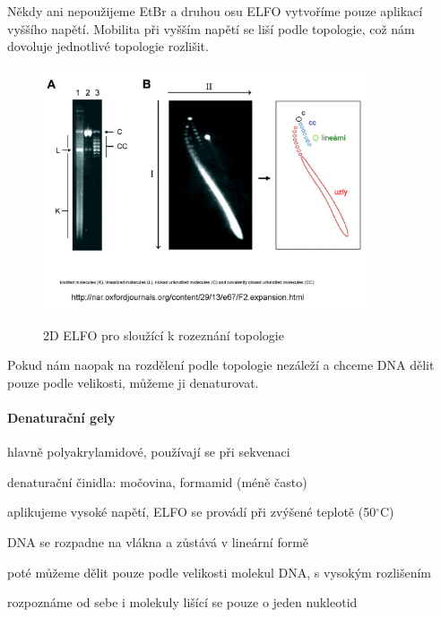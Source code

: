 \documentclass[DIV=8]{scrreprt}
\begin{document}
Někdy ani nepoužijeme EtBr a druhou osu ELFO vytvoříme pouze aplikací vyššího napětí. Mobilita při vyšším napětí se liší podle topologie, což nám dovoluje jednotlivé topologie rozlišit. \begin{figure}
    \caption{2D ELFO pro sloužící k rozeznání topologie}
    \includegraphics[width=0.85\textwidth]{slides-6/slide-27.jpg}
    \centering
    \label{}
\end{figure}


Pokud nám naopak na rozdělení podle topologie nezáleží a chceme DNA dělit pouze podle velikosti, můžeme ji denaturovat.

\paragraph{Denaturační gely}
\begin{myItemize}[nosep]
    \item hlavně polyakrylamidové, používají se při sekvenaci
    \item denaturační činidla: močovina, formamid (méně často)
    \item aplikujeme vysoké napětí, ELFO se provádí při zvýšené teplotě (50\(^{\circ}\)C)
\begin{myItemize}[nosep]
    \item DNA se rozpadne na vlákna a zůstává v lineární formě
\end{myItemize}

    \item poté můžeme dělit pouze podle velikosti molekul DNA, s vysokým rozlišením
\begin{myItemize}[nosep]
    \item rozpoznáme od sebe i molekuly lišící se pouze o jeden nukleotid
\end{myItemize}

\end{myItemize}
\end{document}

